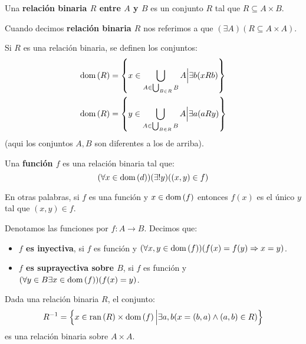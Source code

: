 \documentclass[12pt]{report}
\newcounter{it}
\theoremstyle{largebreak}
\newcommand\cf[3]{\ensuremath{#1:#2\rightarrow#3}}
\newcommand\dom[1]{\ensuremath{\textup{dom}\left(#1\right)}}
\newcommand\ran[1]{\ensuremath{\textup{ran}\left(#1\right)}}
\begin{document}
    \begin{mydef}
        Una \textbf{relación binaria $R$ entre $A$ y $B$} es un conjunto $R$ tal que $R\subseteq A\times B$.

        Cuando decimos \textbf{relación binaria $R$} nos referimos a que $(\exists A)(R\subseteq A\times A)$.

        Si $R$ es una relación binaria, se definen los conjuntos:
        \begin{equation*}
            \begin{split}
                \dom{R}&=\left\{x\in\bigcup_{ A\in \bigcup_{ B\in R}B}A\Big|\exists b (xRb) \right\} \\
            \dom{R}&=\left\{y\in\bigcup_{ A\in \bigcup_{ B\in R}B}A\Big|\exists a (aRy)  \right\} \\
            \end{split}
        \end{equation*}
        (aqui los conjuntos $A,B$ son diferentes a los de arriba).
    \end{mydef}

    \begin{mydef}
        Una \textbf{función $f$} es una relación binaria tal que:
        \begin{equation*}
            (\forall x\in\dom{d})(\exists !y)((x,y)\in f)
        \end{equation*}
    \end{mydef}

    \begin{obs}
        En otras palabras, si $f$ es una función y $x\in\dom{f}$ entonces $f(x)$ es el único $y$ tal que $(x,y)\in f$.
    \end{obs}

    \begin{mydef}
        Denotamos las funciones por $\cf{f}{A}{B}$. Decimos que:
        \begin{itemize}
            \item \textbf{$f$ es inyectiva}, si $f$ es función y $(\forall x,y\in\dom{f})(f(x)=f(y)\Rightarrow x=y)$.
            \item \textbf{$f$ es suprayectiva sobre $B$}, si $f$ es función y $(\forall y\in B\exists x\in\dom{f})(f(x)=y)$.
        \end{itemize}
    \end{mydef}

    \begin{propo}
        Dada una relación binaria $R$, el conjunto:
        \begin{equation*}
            R^{ -1}=\left\{x\in\ran{R}\times\dom{f}\Big|\exists a,b(x=(b,a)\land(a,b)\in R) \right\}
        \end{equation*}
        es una relación binaria sobre $A\times A$.
    \end{propo}
\end{document}
